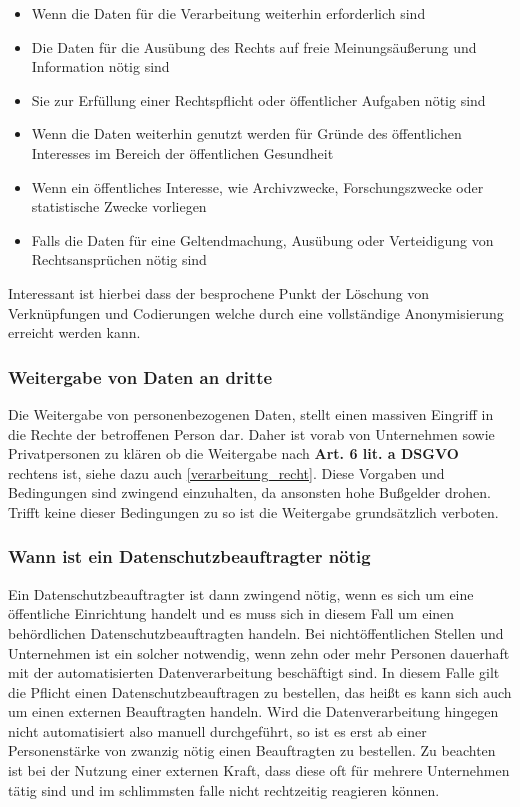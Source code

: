 \documentclass[a4paper, 12pt]{article}
\begin{document}
\begin{itemize}
	\item Wenn die Daten für die Verarbeitung weiterhin erforderlich sind
	\item Die Daten für die Ausübung des Rechts auf freie Meinungsäußerung und Information nötig sind
	\item Sie zur Erfüllung einer Rechtspflicht oder öffentlicher Aufgaben nötig sind
	\item Wenn die Daten weiterhin genutzt werden für Gründe des öffentlichen Interesses im Bereich der öffentlichen Gesundheit
	\item Wenn ein öffentliches Interesse, wie Archivzwecke, Forschungszwecke oder statistische Zwecke vorliegen
	\item Falls die Daten für eine Geltendmachung, Ausübung oder Verteidigung von Rechtsansprüchen nötig sind
\end{itemize}
Interessant ist hierbei dass der besprochene Punkt der Löschung von Verknüpfungen und Codierungen welche durch eine vollständige Anonymisierung erreicht werden kann.

\subsubsection{Weitergabe von Daten an dritte}
Die Weitergabe von personenbezogenen Daten, stellt einen massiven Eingriff in die Rechte der betroffenen Person dar. Daher ist vorab von Unternehmen sowie Privatpersonen zu klären ob die Weitergabe nach \textbf{Art. 6 lit. a DSGVO} rechtens ist, siehe dazu auch \ref{verarbeitung_recht}. Diese Vorgaben und Bedingungen sind zwingend einzuhalten, da ansonsten hohe Bußgelder drohen. Trifft keine dieser Bedingungen zu so ist die Weitergabe grundsätzlich verboten.
\subsubsection{Wann ist ein Datenschutzbeauftragter nötig}
Ein Datenschutzbeauftragter ist dann zwingend nötig, wenn es sich um eine öffentliche Einrichtung handelt und es muss sich in diesem Fall um einen behördlichen Datenschutzbeauftragten handeln. Bei nichtöffentlichen Stellen und Unternehmen ist ein solcher notwendig, wenn zehn oder mehr Personen dauerhaft mit der automatisierten Datenverarbeitung beschäftigt sind. In diesem Falle gilt die Pflicht einen Datenschutzbeauftragen zu bestellen, das heißt es kann sich auch um einen externen Beauftragten handeln. Wird die Datenverarbeitung hingegen nicht automatisiert also manuell durchgeführt, so ist es erst ab einer Personenstärke von zwanzig nötig einen Beauftragten zu bestellen. Zu beachten ist bei der Nutzung einer externen Kraft, dass diese oft für mehrere Unternehmen tätig sind und im schlimmsten falle nicht rechtzeitig reagieren können.
\end{document}
